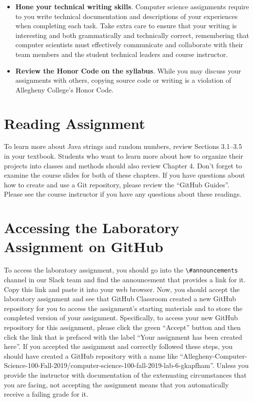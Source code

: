 \documentclass[11pt]{article}
\newcommand{\channel}[1]{\lstinline{#1}}
\begin{document}
\begin{itemize}
\item {\bf Hone your technical writing skills}. Computer science assignments
  require to you write technical documentation and descriptions of your
  experiences when completing each task. Take extra care to ensure that your
  writing is interesting and both grammatically and technically correct,
  remembering that computer scientists must effectively communicate and
  collaborate with their team members and the student technical leaders and
  course instructor.

\item {\bf Review the Honor Code on the syllabus}. While you may discuss your
  assignments with others, copying source code or writing is a violation of
  Allegheny College's Honor Code.

\end{itemize}

\section*{Reading Assignment}

To learn more about Java strings and random numbers, review Sections 3.1--3.5 in
your textbook. Students who want to learn more about how to organize their
projects into classes and methods should also review Chapter 4. Don't forget to
examine the course slides for both of these chapters. If you have questions
about how to create and use a Git repository, please review the ``GitHub
Guides''. Please see the course instructor if you have any questions about these
readings.

\section*{Accessing the Laboratory Assignment on GitHub}

To access the laboratory assignment, you should go into the
\channel{\#announcements} channel in our Slack team and find the announcement
that provides a link for it. Copy this link and paste it into your web browser.
Now, you should accept the laboratory assignment and see that GitHub Classroom
created a new GitHub repository for you to access the assignment's starting
materials and to store the completed version of your assignment. Specifically,
to access your new GitHub repository for this assignment, please click the green
``Accept'' button and then click the link that is prefaced with the label ``Your
assignment has been created here''. If you accepted the assignment and correctly
followed these steps, you should have created a GitHub repository with a name
like
``Allegheny-Computer-Science-100-Fall-2019/computer-science-100-fall-2019-lab-6-gkapfham''.
Unless you provide the instructor with documentation of the extenuating
circumstances that you are facing, not accepting the assignment means that you
automatically receive a failing grade for it.
\end{document}
